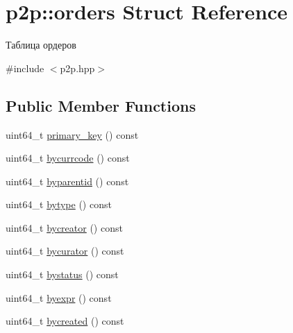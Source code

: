 \hypertarget{structp2p_1_1orders}{}\section{p2p\+:\+:orders Struct Reference}
\label{structp2p_1_1orders}


Таблица ордеров  




{\ttfamily \#include $<$p2p.\+hpp$>$}

\subsection*{Public Member Functions}
\begin{DoxyCompactItemize}
\item 
uint64\+\_\+t \mbox{\hyperlink{structp2p_1_1orders_a550c32d8d3f0ec4770662acec7bb5197}{primary\+\_\+key}} () const
\item 
uint64\+\_\+t \mbox{\hyperlink{structp2p_1_1orders_ab6f05a725122c94d3f2dcfaf24322c47}{bycurrcode}} () const
\item 
uint64\+\_\+t \mbox{\hyperlink{structp2p_1_1orders_a2b790da517561e8a593b6c56d63c4cfd}{byparentid}} () const
\item 
uint64\+\_\+t \mbox{\hyperlink{structp2p_1_1orders_a17505cc3759a5ba5099f490c982535e1}{bytype}} () const
\item 
uint64\+\_\+t \mbox{\hyperlink{structp2p_1_1orders_a91b49c417f79ef405982bfe348651a98}{bycreator}} () const
\item 
uint64\+\_\+t \mbox{\hyperlink{structp2p_1_1orders_a76fa8b54f391ccd2e29b640d4c0199df}{bycurator}} () const
\item 
uint64\+\_\+t \mbox{\hyperlink{structp2p_1_1orders_a31e70a285fb324d4ee07b1b149debff3}{bystatus}} () const
\item 
uint64\+\_\+t \mbox{\hyperlink{structp2p_1_1orders_a8cf94dfb0902511c6baae1dd0434dcbf}{byexpr}} () const
\item 
uint64\+\_\+t \mbox{\hyperlink{structp2p_1_1orders_a6eab9cb4d0f7b605aef8856aad730fe5}{bycreated}} () const
\end{DoxyCompactItemize}

